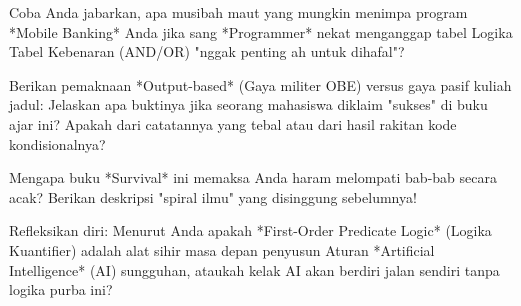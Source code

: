 \documentclass[../main]{subfiles}
\begin{document}
\begin{latihan}
  \item Coba Anda jabarkan, apa musibah maut yang mungkin menimpa program *Mobile Banking* Anda jika sang *Programmer* nekat menganggap tabel Logika Tabel Kebenaran (AND/OR) "nggak penting ah untuk dihafal"?
  \item Berikan pemaknaan *Output-based* (Gaya militer OBE) versus gaya pasif kuliah jadul: Jelaskan apa buktinya jika seorang mahasiswa diklaim "sukses" di buku ajar ini? Apakah dari catatannya yang tebal atau dari hasil rakitan kode kondisionalnya?
  \item Mengapa buku *Survival* ini memaksa Anda haram melompati bab-bab secara acak? Berikan deskripsi "spiral ilmu" yang disinggung sebelumnya!
  \item Refleksikan diri: Menurut Anda apakah *First-Order Predicate Logic* (Logika Kuantifier) adalah alat sihir masa depan penyusun Aturan *Artificial Intelligence* (AI) sungguhan, ataukah kelak AI akan berdiri jalan sendiri tanpa logika purba ini?
\end{latihan}
\end{document}
